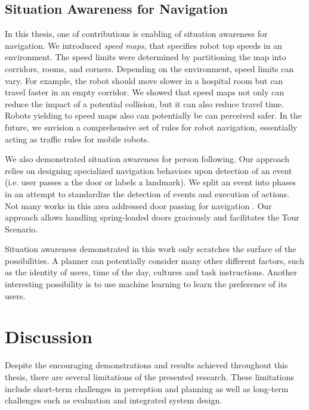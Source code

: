 \subsection{Situation Awareness for Navigation}

In this thesis, one of contributions is enabling of situation awareness for navigation. We introduced \textit{speed maps}, that specifies robot  top speeds in an environment. The speed limits were determined by partitioning the map into corridors, rooms, and corners. Depending on the environment, speed limits can vary. For example, the robot should move slower in a hospital room but can travel faster in an empty corridor. We showed that speed maps not only can reduce the impact of a potential collision, but it can also reduce travel time. Robots yielding to speed maps also can potentially be can perceived safer. In the future, we envision a comprehensive set of rules for robot navigation, essentially acting as traffic rules for mobile robots.

We also demonstrated situation awareness for person following. Our approach relies on designing specialized navigation behaviors upon detection of an event (i.e. user passes a the door or labels a landmark). We split an event into phases in an attempt to standardize the detection of events and execution of actions. Not many works in this area addressed door passing for navigation \cite{zender2007integrated}. Our approach allows handling spring-loaded doors graciously and facilitates the Tour Scenario.

Situation awareness demonstrated in this work only scratches the surface of the possibilities. A planner can potentially consider many other different factors, such as the identity of users, time of the day, cultures and task instructions. Another interesting possibility is to use machine learning to learn the preference of its users.


\section{Discussion}

Despite the encouraging demonstrations and results achieved throughout this thesis, there are several limitations of the presented research. These limitations include short-term challenges in perception and planning as well as long-term challenges such as evaluation and integrated system design. 

